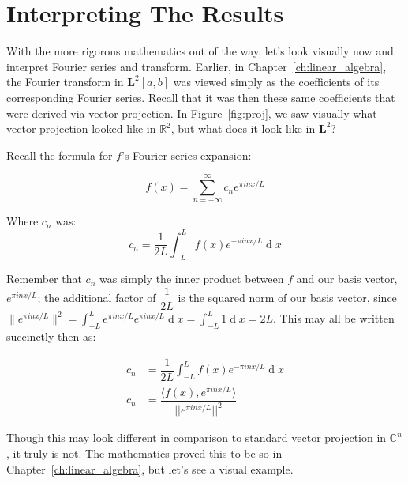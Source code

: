 \documentclass[12pt,a4paper]{report}
\DeclareMathOperator{\deriv}{d}
\theoremstyle{thms}
\theoremstyle{defns}
\begin{document}
\chapter{Interpreting The Results}
\label{ch:interpreting}
With the more rigorous mathematics out of the way, let's look visually now and interpret Fourier series and transform. Earlier, in Chapter~\ref{ch:linear_algebra}, the Fourier transform in $\mathbf{L}^2[a, b]$ was viewed simply as the coefficients of its corresponding Fourier series. Recall that it was then these same coefficients that were derived via vector projection. In Figure~\ref{fig:proj}, we saw visually what vector projection looked like in $\mathbb{R}^2$, but what does it look like in $\mathbf{L}^2$?

Recall the formula for $f$'s Fourier series expansion:

\begin{equation}
    f(x) = \sum_{n=-\infty}^{\infty} c_ne^{\pi inx/L}
\end{equation}

Where $c_n$ was:
\begin{equation}
    c_n = \dfrac{1}{2L}\int_{-L}^{L} f(x)e^{-\pi inx/L}\deriv{x}
\end{equation}

Remember that $c_n$ was simply the inner product between $f$ and our basis vector, $e^{\pi inx/L}$; the additional factor of $\dfrac{1}{2L}$ is the squared norm of our basis vector, since $\|e^{\pi inx/L}\|^2 = \int_{-L}^{L} e^{\pi inx/L}\overline{e^{\pi inx/L}}\deriv{x} = \int_{-L}^{L} 1\deriv{x} = 2L$. This may all be written succinctly then as:

\begin{align}
    c_n                        & = \dfrac{1}{2L}\int_{-L}^{L} f(x)e^{-\pi inx/L}\deriv{x}                          \\
    c_n                        & = \dfrac{\langle f(x), e^{\pi inx/L} \rangle}{||e^{\pi inx/L}||^2}
\end{align}

Though this may look different in comparison to standard vector projection in $\mathbb{C}^n$, it truly is not. The mathematics proved this to be so in Chapter~\ref{ch:linear_algebra}, but let's see a visual example.
\end{document}
